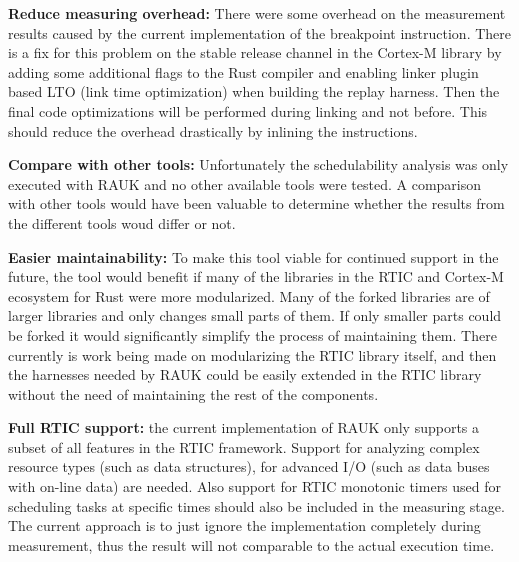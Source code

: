 \textbf{Reduce measuring overhead:} There were some overhead on the measurement
results caused by the current implementation of the breakpoint instruction.
There is a fix for this problem on the stable release channel in the Cortex-M
library by adding some additional flags to the Rust compiler and enabling
linker plugin based LTO (link time optimization) when building the replay
harness. Then the final code optimizations will be performed during linking
and not before. This should reduce the overhead drastically by inlining the
instructions.

\textbf{Compare with other tools:} Unfortunately the schedulability analysis
was only executed with RAUK and no other available tools were tested. A
comparison with other tools would have been valuable to determine whether the
results from the different tools woud differ or not.

\textbf{Easier maintainability:} To make this tool viable for continued support
in the future, the tool would benefit if many of the libraries in the RTIC and
Cortex-M ecosystem for Rust were more modularized. Many of the forked libraries
are of larger libraries and only changes small parts of them. If only smaller
parts could be forked it would significantly simplify the process of
maintaining them. There currently is work being made on modularizing the RTIC
library itself, and then the harnesses needed by RAUK could be easily extended
in the RTIC library without the need of maintaining the rest of the components.

\textbf{Full RTIC support:} the current implementation of RAUK only supports
a subset of all features in the RTIC framework. Support for analyzing complex
resource types (such as data structures), for advanced I/O (such as data
buses with on-line data) are needed. Also support for RTIC monotonic timers used
for scheduling tasks at specific times should also be included in the measuring
stage. The current approach is to just ignore the implementation completely
during measurement, thus the result will not comparable to the actual execution
time.


